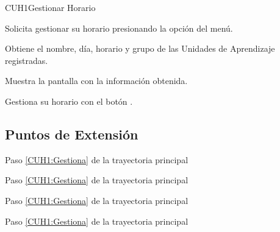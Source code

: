 \begin{UseCase}{CUH1}{Gestionar Horario}
    
    
    
    
    
\end{UseCase}
    
\begin{UCtrayectoria}

    \UCpaso[\UCactor] Solicita gestionar su horario presionando la opción  del menú.
    
    \UCpaso[\UCsist] Obtiene el nombre, día, horario y grupo de las Unidades de Aprendizaje registradas.
        
    \UCpaso[\UCsist] Muestra la pantalla  con la información obtenida.
        
    \UCpaso[\UCactor] \label{CUH1:Gestiona} Gestiona su horario con el botón \btnEditar.
        
\end{UCtrayectoria}

\subsection{Puntos de Extensión}

{Paso \ref{CUH1:Gestiona} de la trayectoria principal}
{}

{Paso \ref{CUH1:Gestiona} de la trayectoria principal}
{}

{Paso \ref{CUH1:Gestiona} de la trayectoria principal}
{}

{Paso \ref{CUH1:Gestiona} de la trayectoria principal}
{}
